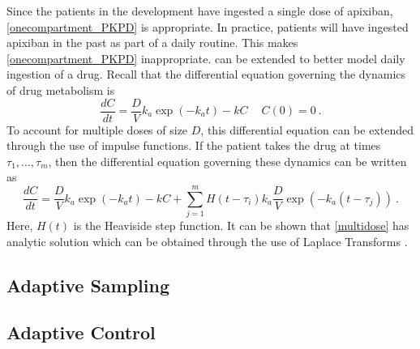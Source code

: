 Since the patients in the development have ingested a single dose of apixiban, \cref{onecompartment_PKPD} is appropriate.  In practice, patients will have ingested apixiban in the past as part of a daily routine.  This makes \cref{onecompartment_PKPD} inappropriate.   can be extended to better model daily ingestion of a drug.  Recall that the differential equation governing the dynamics of drug metabolism is
\begin{equation}
	\dfrac{dC}{dt} = \dfrac{D}{V}k_a\exp(-k_a t) - kC \> \quad C(0) = 0 \>.
\end{equation}
To account for multiple doses of size $ D $, this differential equation can be extended through the use of impulse functions.  If the patient takes the drug at times $ \tau_1, \dots , \tau_m $, then the differential equation governing these dynamics can be written as 
\begin{equation} \label{multidose}
\dfrac{dC}{dt} = \dfrac{D}{V}k_a\exp(-k_a t) - kC + \sum_{j=1}^m H(t - \tau_i) k_a \dfrac{D}{V}\exp(-k_a(t-\tau_j)) \>.
\end{equation}
Here, $ H(t) $ is the Heaviside step function.  It can be shown that \cref{multidose} has analytic solution which can be obtained through the use of Laplace Transforms \cite{boyce2012differential}.


\subsection{Adaptive Sampling}



\subsection{Adaptive Control}
